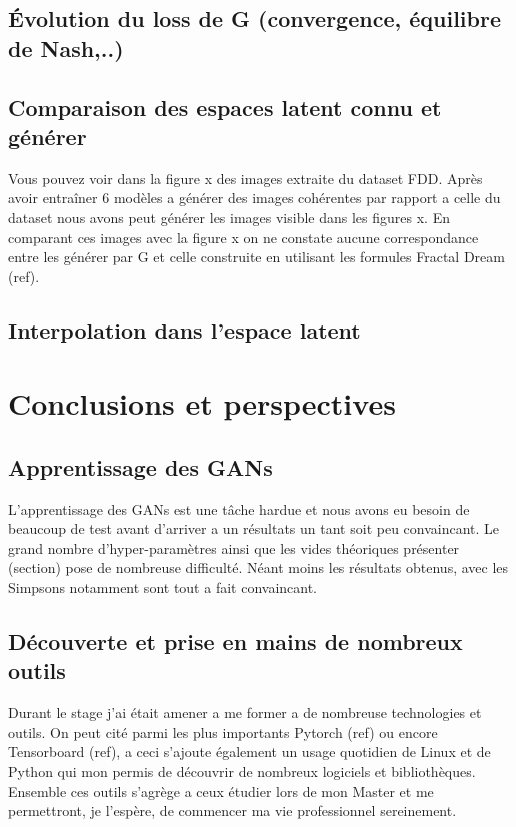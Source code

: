 \documentclass[11pt]{article}
\begin{document}
\subsection{Évolution du loss de G (convergence, équilibre de Nash,..)}
\subsection{Comparaison des espaces latent connu et générer}
Vous pouvez voir dans la figure x des images extraite du dataset FDD.
Après avoir entraîner 6 modèles a générer des images cohérentes par rapport a celle du dataset nous avons peut générer les images visible dans les figures x. 
En comparant ces images avec la figure x on ne constate aucune correspondance entre les générer par G et celle construite en utilisant les formules Fractal Dream (ref).


\subsection{Interpolation dans l'espace latent}

\section{Conclusions et perspectives}

\subsection{Apprentissage des GANs}
L'apprentissage des GANs est une tâche hardue et nous avons eu besoin de beaucoup de test avant d'arriver a un résultats un tant soit peu convaincant. Le grand nombre d'hyper-paramètres ainsi que les vides théoriques présenter (section) pose de nombreuse difficulté. Néant moins les résultats obtenus, avec les Simpsons notamment sont tout a fait convaincant.

\subsection{Découverte et prise en mains de nombreux outils}
Durant le stage j'ai était amener a me former a de nombreuse technologies et outils.
On peut cité parmi les plus importants Pytorch (ref) ou encore Tensorboard (ref), a ceci s'ajoute également un usage quotidien de Linux et de Python qui mon permis de découvrir de nombreux logiciels et bibliothèques.
Ensemble ces outils s'agrège a ceux étudier lors de mon Master et me permettront, je l'espère, de commencer ma vie professionnel sereinement.
\end{document}
